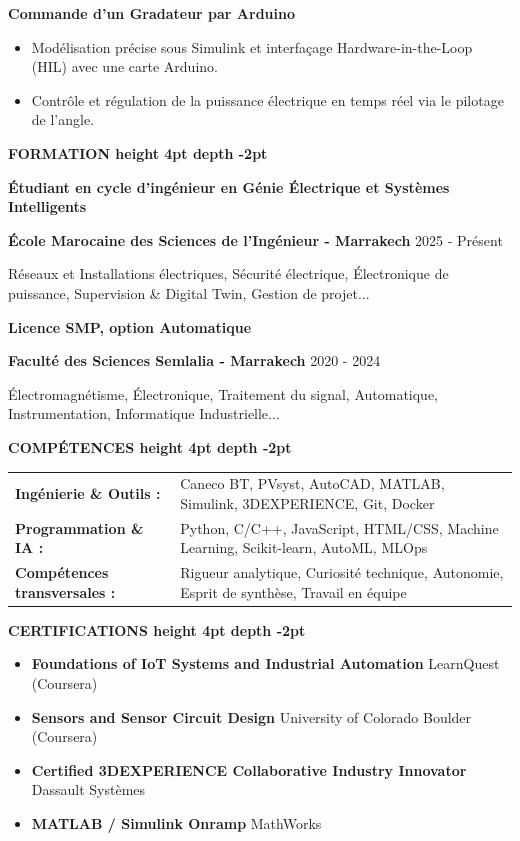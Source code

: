 \documentclass[10pt,a4paper]{altacv}
\renewcommand{\cvsection}[2][]{%
  \vspace{3pt}%
  {\color{heading}\LARGE\bfseries #2 \hspace{0.2em}\leaders\vrule height 4pt depth -2pt\hfill\mbox{}}\par\vspace{2pt}
}
\renewcommand{\cvevent}[4]{%
  {\large\bfseries\color{accent}#1\par}
  \vspace{1pt}\normalsize
  \ifstrequal{#2}{}{}{%
    \textbf{\color{emphasis}#2\ifstrequal{#4}{}{}{ - #4}}%
  }%
  \hfill
  \ifstrequal{#3}{}{}{{\small#3}}%
  \par\vspace{1pt}
}
\begin{document}
{\large\bfseries\color{accent} Commande d'un Gradateur par Arduino}\\[0.05cm]
\begin{itemize}
  \item Modélisation précise sous Simulink et interfaçage Hardware-in-the-Loop (HIL) avec une carte Arduino.
  \item Contrôle et régulation de la puissance électrique en temps réel via le pilotage de l'angle.
\end{itemize}

\cvsection{FORMATION}
\cvevent{Étudiant en cycle d'ingénieur en Génie Électrique et Systèmes Intelligents}{École Marocaine des Sciences de l'Ingénieur}{2025 - Présent}{Marrakech}
\small Réseaux et Installations électriques, Sécurité électrique, Électronique de puissance, Supervision \& Digital Twin, Gestion de projet...

\cvevent{Licence SMP, option Automatique}{Faculté des Sciences Semlalia}{2020 - 2024}{Marrakech}
\small Électromagnétisme, Électronique, Traitement du signal, Automatique, Instrumentation, Informatique Industrielle...

\cvsection{COMPÉTENCES}
\begin{tabular}{@{}ll@{}}
\textbf{Ingénierie \& Outils :} & Caneco BT, PVsyst, AutoCAD, MATLAB, Simulink, 3DEXPERIENCE, Git, Docker \\[2pt]
\textbf{Programmation \& IA :} & Python, C/C++, JavaScript, HTML/CSS, Machine Learning, Scikit-learn, AutoML, MLOps \\[2pt]
\textbf{Compétences transversales :} & Rigueur analytique, Curiosité technique, Autonomie, Esprit de synthèse, Travail en équipe \\
\end{tabular}

\cvsection{CERTIFICATIONS}
\begin{itemize}[leftmargin=*, label=\textbullet, itemsep=2pt]
  \item \textbf{Foundations of IoT Systems and Industrial Automation} \hfill {\color{emphasis}LearnQuest (Coursera)}
  \item \textbf{Sensors and Sensor Circuit Design} \hfill {\color{emphasis}University of Colorado Boulder (Coursera)}
  \item \textbf{Certified 3DEXPERIENCE Collaborative Industry Innovator} \hfill {\color{emphasis}Dassault Systèmes}
  \item \textbf{MATLAB / Simulink Onramp} \hfill {\color{emphasis}MathWorks}
\end{itemize}
\end{document}
